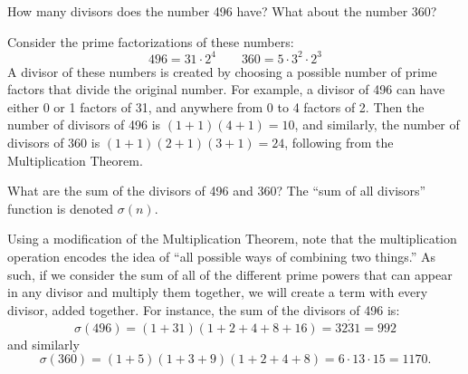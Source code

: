 \label{03-0131}
\begin{problem}{4}
    How many divisors does the number 496 have? What about the number 360?
\end{problem}

\begin{solution}
    Consider the prime factorizations of these numbers: 
    \[
        496 = 31 \cdot 2^4  \qquad 360 = 5 \cdot 3^2 \cdot 2^3
    \]
    A divisor of these numbers is created by choosing a possible number of 
    prime factors that divide the original number. For example, a divisor
    of 496 can have either 0 or 1 factors of 31, and anywhere from 0 to 4 
    factors of 2. Then the number of divisors of 496 is $(1 + 1) (4 + 1) = 10$,
    and similarly, the number of divisors of 360 is $(1 + 1)(2 + 1)(3 + 1) = 24$, 
    following from the Multiplication Theorem.
\end{solution}

\begin{problem}{5}
    What are the sum of the divisors of 496 and 360? The ``sum of all divisors''
    function is denoted $\sigma(n)$. 
\end{problem}
\begin{solution}
    Using a modification of the Multiplication Theorem, note that the 
    multiplication operation encodes the idea of ``all possible ways of 
    combining two things.'' As such, if we consider the sum of all of the 
    different prime powers that can appear in any divisor and multiply them
    together, we will create a term with every divisor, added together. For
    instance, the sum of the divisors of 496 is:
    \[
        \sigma(496) = (1 + 31)(1 + 2 + 4  + 8 + 16) = 32 \dot 31 = 992
    \]
    and similarly 
    \[
        \sigma(360) = (1 + 5)(1 + 3 + 9)(1 + 2 + 4 + 8) = 6 \cdot 13 \cdot 15 = 1170.
    \]
\end{solution}

